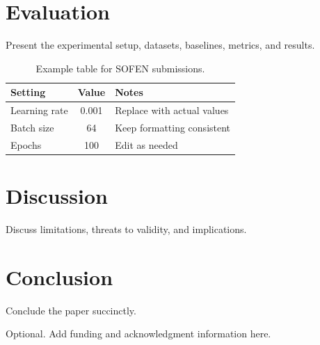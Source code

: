 \documentclass[acmsmall,review,screen]{acmart}
\begin{document}
\section{Evaluation}
Present the experimental setup, datasets, baselines, metrics, and results.

\begin{table}[t]
\caption{Example table for SOFEN submissions.}
\label{tab:example}
\begin{tabular}{lcl}
\toprule
Setting & Value & Notes \\
\midrule
Learning rate & 0.001 & Replace with actual values \\
Batch size    & 64    & Keep formatting consistent \\
Epochs        & 100   & Edit as needed \\
\bottomrule
\end{tabular}
\end{table}

\section{Discussion}
Discuss limitations, threats to validity, and implications.

\section{Conclusion}
Conclude the paper succinctly.

\begin{acks}
Optional. Add funding and acknowledgment information here.
\end{acks}



\end{document}
